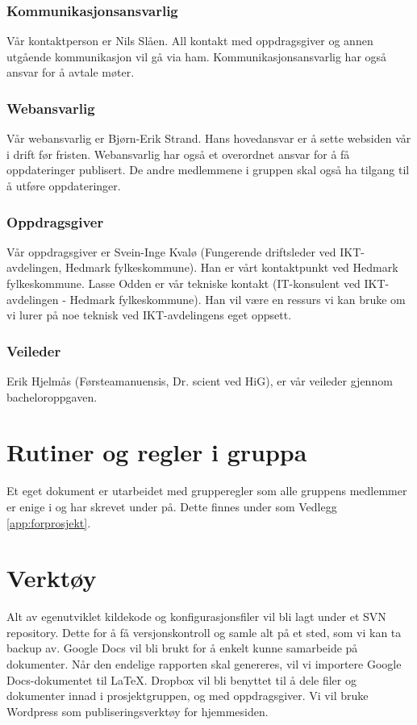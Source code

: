 \subsubsection{Kommunikasjonsansvarlig}
Vår kontaktperson er Nils Slåen. All kontakt med oppdragsgiver og annen utgående kommunikasjon vil gå via ham. Kommunikasjonsansvarlig har også ansvar for å avtale møter.

\subsubsection{Webansvarlig}
Vår webansvarlig er Bjørn-Erik Strand. Hans hovedansvar er å sette websiden vår i drift før fristen. Webansvarlig har også et overordnet ansvar for å få oppdateringer publisert. De andre medlemmene i gruppen skal også ha tilgang til å utføre oppdateringer.

\subsubsection{Oppdragsgiver}
Vår oppdragsgiver er Svein-Inge Kvalø (Fungerende driftsleder ved IKT-avdelingen, Hedmark fylkeskommune). Han er vårt kontaktpunkt ved Hedmark fylkeskommune. Lasse Odden er vår tekniske kontakt (IT-konsulent ved IKT-avdelingen - Hedmark fylkeskommune). Han vil være en ressurs vi kan bruke om vi lurer på noe teknisk ved IKT-avdelingens eget oppsett.

\subsubsection{Veileder}
Erik Hjelmås (Førsteamanuensis, Dr. scient ved HiG), er vår veileder gjennom bacheloroppgaven.

\section{Rutiner og regler i gruppa}
Et eget dokument er utarbeidet med grupperegler som alle gruppens medlemmer er enige i og har skrevet under på. Dette finnes under som Vedlegg \ref{app:forprosjekt}.

\section{Verktøy}
Alt av egenutviklet kildekode og konfigurasjonsfiler vil bli lagt under et SVN repository. Dette for å få versjonskontroll og samle alt på et sted, som vi kan ta backup av. Google Docs vil bli brukt for å enkelt kunne samarbeide på dokumenter. Når den endelige rapporten skal genereres, vil vi importere Google Docs-dokumentet til LaTeX. Dropbox vil bli benyttet til å dele filer og dokumenter innad i prosjektgruppen, og med oppdragsgiver. Vi vil bruke Wordpress som publiseringsverktøy for hjemmesiden.

